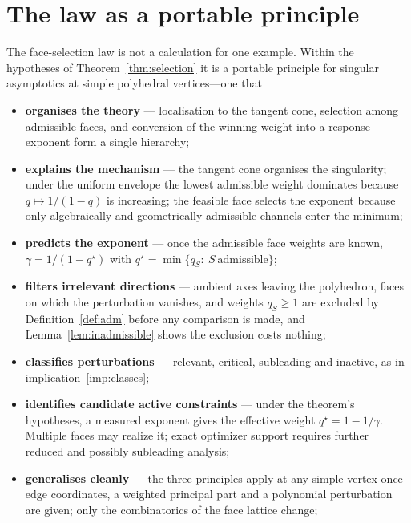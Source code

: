\documentclass[11pt]{article}
\theoremstyle{definition}
\theoremstyle{remark}
\begin{document}
\section{The law as a portable principle}

The face-selection law is not a calculation for one example. Within the
hypotheses of Theorem~\ref{thm:selection} it is a portable principle for
singular asymptotics at simple polyhedral vertices---one that

\begin{itemize}
  \item \textbf{organises the theory} --- localisation to the tangent cone,
        selection among admissible faces, and conversion of the winning weight
        into a response exponent form a single hierarchy;

  \item \textbf{explains the mechanism} --- the tangent cone organises the
        singularity; under the uniform envelope
        the lowest admissible weight dominates
        because $q\mapsto1/(1-q)$ is increasing; the feasible face selects the
        exponent because only algebraically and geometrically admissible
        channels enter the minimum;

  \item \textbf{predicts the exponent} --- once the admissible face weights
        are known, $\gamma=1/(1-q^\star)$ with
        $q^\star=\min\{q_S:\ S\ \text{admissible}\}$;

  \item \textbf{filters irrelevant directions} --- ambient axes leaving the
        polyhedron, faces on which the perturbation vanishes, and weights
        $q_S\ge1$ are excluded by Definition~\ref{def:adm} before any
        comparison is made, and Lemma~\ref{lem:inadmissible} shows the
        exclusion costs nothing;

  \item \textbf{classifies perturbations} --- relevant, critical, subleading
        and inactive, as in implication~\ref{imp:classes};

  \item \textbf{identifies candidate active constraints} --- under the theorem's
        hypotheses, a measured exponent gives the effective weight
        $q^\star=1-1/\gamma$. Multiple faces may realize it; exact optimizer
        support requires further reduced and possibly subleading analysis;

  \item \textbf{generalises cleanly} --- the three principles apply at any
        simple vertex once edge coordinates, a weighted principal part and a
        polynomial perturbation are given; only the combinatorics of the face
        lattice change;


\end{itemize}
\end{document}
